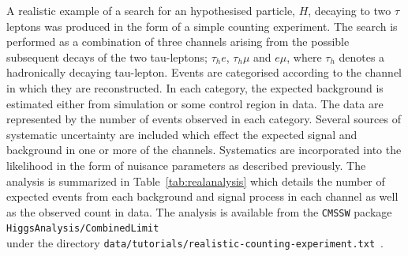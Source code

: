 A realistic example of a search for an hypothesised particle, $H$, 
decaying to two $\tau$ leptons was produced in the form 
of a simple counting experiment. The search is performed as a combination of 
three channels arising from the possible subsequent 
decays of the two tau-leptons; $\tau_{h}e$, $\tau_{h}\mu$ and $e\mu$, where $\tau_{h}$
denotes a hadronically decaying tau-lepton. 
Events are categorised according to the channel in which they are reconstructed.
In each category, the expected background is estimated
either from simulation or some control region in data. 
The data are represented by the number of events observed in each category.
Several sources of systematic uncertainty are included which effect the
expected signal and background in one or more of the channels. 
Systematics are incorporated into the likelihood in the form of nuisance 
parameters as described previously. The analysis is summarized in 
Table~\ref{tab:realanalysis} which details the number of expected events 
from each background and signal process in each channel as well as the 
observed count in data. 
The analysis is available from the \texttt{CMSSW} package \texttt{HiggsAnalysis/CombinedLimit}\\
under the directory \texttt{data/tutorials/realistic-counting-experiment.txt}~\citep{combinationstwiki}.

